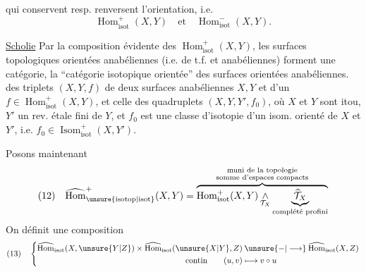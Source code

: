 qui conservent resp. renversent l'orientation, i.e.
\[
\operatorname{Hom}_{\mathrm{isot}}^+(X,Y)\quad\text{et}\quad\operatorname{Hom}_{\mathrm{isot}}^-(X,Y).
\]

\uline{Scholie} Par la composition évidente des $\operatorname{Hom}_{\mathrm{isot}}^+(X,Y)$, les surfaces topologiques orientées anabéliennes (i.e. de t.f. et anabéliennes)  forment une catégorie, la ``catégorie isotopique orientée'' des surfaces orientées anabéliennes.   des triplets $(X,Y,f)$ de deux surfaces  anabéliennes $X,Y$ et d'un $f\in\operatorname{Hom}_{\mathrm{isot}}^+(X,Y)$, et celle des quadruplets $(X,Y,Y',f_0)$, où $X$ et $Y$ sont itou, $Y'$ un rev. étale fini de $Y$, et $f_0$ est une classe d'isotopie d'un isom. orienté de $X$ et $Y'$, i.e. $f_0\in\operatorname{Isom}_{\mathrm{isot}}^+(X,Y')$.

Posons maintenant
\[
(12)\quad
\widehat{\operatorname{Hom}}^{+}_{\unsure{\mathrm{isotop}|\mathrm{isot}}}(X,Y)
=\overbrace{\operatorname{Hom}^{+}_{\mathrm{isot}}(X,Y)\mathop{\wedge}_{\mathcal{T}_X}
\underbrace{\widehat{\mathcal{T}}_X}_{\text{complété profini}}}^{\substack{\text{muni de la topologie}\\\text{somme d'espaces compacts}}}
\]
On définit une composition
\[
(13)\quad\left\{
\begin{aligned}
\widehat{\operatorname{Hom}}_{\mathrm{isot}}(X,\unsure{Y|Z})\times
\widehat{\operatorname{Hom}}_{\mathrm{isot}}(\unsure{X|Y},Z)
&\mathbin{\unsure{-|\longrightarrow}}\widehat{\operatorname{Hom}}_{\mathrm{isot}}(X,Z)\\
\text{contin}\qquad (u,v)&\longmapsto v\circ u
\end{aligned}\right.
\]
